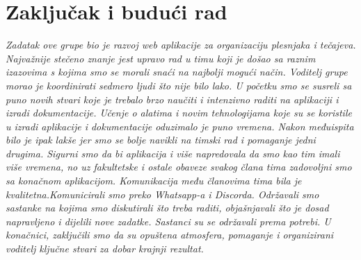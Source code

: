 \chapter{Zaključak i budući rad}
		
	
		 \textit{Zadatak ove grupe bio je razvoj web aplikacije za organizaciju plesnjaka i tečajeva. Najvažnije stečeno znanje jest upravo rad u timu koji je došao sa raznim izazovima s kojima smo se morali snaći na najbolji mogući način. Voditelj grupe morao je koordinirati sedmero ljudi što nije bilo lako. U početku smo se susreli sa puno novih stvari koje je trebalo brzo naučiti i intenzivno raditi na aplikaciji i izradi dokumentacije. Učenje o alatima i novim tehnologijama koje su se koristile u izradi aplikacije i dokumentacije oduzimalo je puno vremena. Nakon međuispita bilo je ipak lakše jer smo se bolje  navikli na timski rad i  pomaganje jedni drugima.  Sigurni smo da bi aplikacija i više napredovala da smo kao tim imali više vremena, no uz fakultetske i ostale obaveze svakog člana tima zadovoljni smo sa konačnom aplikacijom. Komunikacija među članovima tima bila je kvalitetna.Komunicirali smo preko Whatsapp-a i Discorda. Održavali smo sastanke na kojima smo diskutirali što treba raditi, objašnjavali što je dosad napravljeno i dijelili nove zadatke. Sastanci su se održavali prema potrebi.  U konačnici, zaključili smo da su  opuštena atmosfera, pomaganje i organizirani voditelj ključne stvari za dobar krajnji rezultat. }
         
    
		\eject 